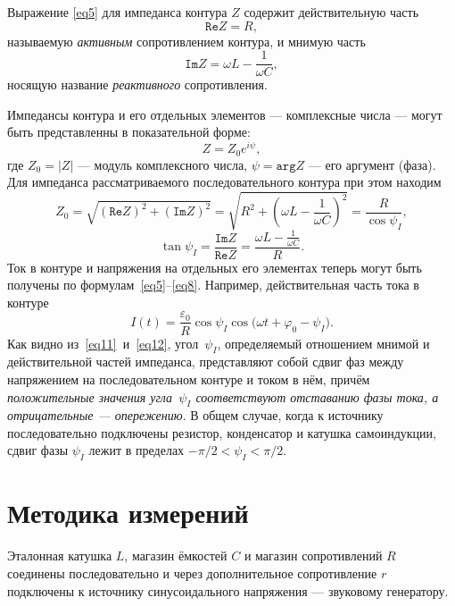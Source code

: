 \documentclass[a4paper, 12pt]{article}
\begin{document}
Выражение \eqref{eq5} для импеданса контура $Z$ содержит действительную часть $$\mathtt{Re}Z = R,$$ называемую \textit{активным} сопротивлением контура, и мнимую часть $$\mathtt{Im}Z = \omega L - \frac{1}{\omega C},$$ носящую название \textit{реактивного} сопротивления.

Импедансы контура и его отдельных элементов --- комплексные числа --- могут быть представленны в показательной форме:
\begin{equation}\label{eq9}
Z = Z_0e^{i\psi},
\end{equation}
где $Z_0 = |Z|$ --- модуль комплексного числа, $\psi = \mathtt{arg}Z$ --- его аргумент (фаза). Для импеданса рассматриваемого последовательного контура при этом находим
\begin{equation}\label{eq10}
Z_0 = \sqrt{(\mathtt{Re}Z)^2 + (\mathtt{Im}Z)^2} = \sqrt{R^2 + \left(\omega L - \frac{1}{\omega C}\right)^2} = \frac{R}{\cos{\psi_I}},
\end{equation}
\begin{equation}\label{eq11}
\tan{\psi_I} = \frac{\mathtt{Im}Z}{\mathtt{Re}Z} = \frac{\omega L - \frac{1}{\omega C}}{R}.
\end{equation}
Ток в контуре и напряжения на отдельных его элементах теперь могут быть получены по формулам~\eqref{eq5}--\eqref{eq8}. Например, действительная часть тока в контуре
\begin{equation}\label{eq12}
I(t) = \frac{\varepsilon_0}{R}\cos{\psi_I}\cos({\omega t + \varphi_0 - \psi_I)}.
\end{equation}
Как видно из~\eqref{eq11}~и~\eqref{eq12}, угол~$\psi_I$, определяемый отношением мнимой и действительной частей импеданса, представляют собой сдвиг фаз между напряжением на последовательном контуре и током в нём, причём \textit{положительные значения угла~$\psi_I$ соответствуют отставанию фазы тока, а отрицательные --- опережению}. В общем случае, когда к источнику последовательно подключены резистор, конденсатор и катушка самоиндукции, сдвиг фазы $\psi_I$ лежит в пределах $-\pi/2 < \psi_I < \pi/2$.

\section{Методика измерений}

Эталонная катушка $L$, магазин ёмкостей $C$ и магазин сопротивлений $R$ соединены последовательно и через дополнительное сопротивление $r$ подключены к источнику синусоидального напряжения --- звуковому генератору.
\end{document}
